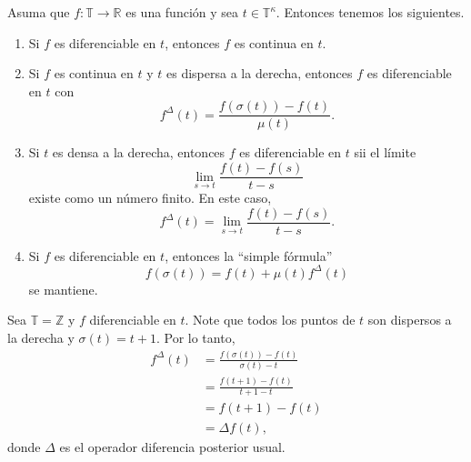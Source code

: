 \begin{frame}
	\begin{theorem}
		Asuma que $f\colon\mathds{T}\rightarrow\mathds{R}$ es una función y sea $t\in\mathds{T}^{\kappa}$. Entonces tenemos los siguientes.
		\begin{enumerate}
			\item Si $f$ es diferenciable en $t$, entonces $f$ es continua en $t$.
			\item Si $f$ es continua en $t$ y $t$ es dispersa a la derecha, entonces $f$ es diferenciable en $t$ con \[ f^{\Delta}\left(t\right)=\frac{f\left(\sigma\left(t\right)\right)-f\left(t\right)}{\mu\left(t\right)}. \]
			\item Si $t$ es densa a la derecha, entonces $f$ es diferenciable en $t$ sii el límite \[ \lim\limits_{s\to t}\frac{f\left(t\right)-f\left(s\right)}{t-s} \] existe como un número finito. En este caso, \[ f^{\Delta}\left(t\right)=\lim\limits_{s\to t}\frac{f\left(t\right)-f\left(s\right)}{t-s}. \]
			\item Si $f$ es diferenciable en $t$, entonces la ``simple fórmula'' \[ f\left(\sigma\left(t\right)\right)=f\left(t\right)+\mu\left(t\right)f^{\Delta}\left(t\right) \] se mantiene.
		\end{enumerate}
	\end{theorem}
\end{frame}

\begin{frame}
	\begin{example}
		Sea $\mathds{T}=\mathds{Z}$ y $f$ diferenciable en $t$. Note que todos los puntos de $t$ son dispersos a la derecha y $\sigma\left(t\right)=t+1$. Por lo tanto,
		\begin{align*}
		f^{\Delta}\left(t\right)
		&=\frac{f\left(\sigma\left(t\right)\right)-f\left(t\right)}{\sigma\left(t\right)-t}\\
		&=\frac{f\left(t+1\right)-f\left(t\right)}{t+1-t}\\
		&=f\left(t+1\right)-f\left(t\right)\\
		&=\Delta f\left(t\right),
		\end{align*}
		donde $\Delta$ es el operador diferencia posterior usual.
	\end{example}
\end{frame}

